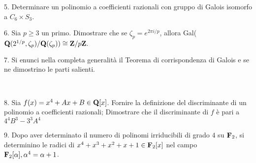 \item{5.} Determinare un polinomio a coefficienti razionali con gruppo di Galois isomorfo a  $C_6\times S_{3}$.
\ve\ \vs

\item{6.} Sia $p\geq3$ un primo. Dimostrare che se $\zeta_p=e^{2\pi i/p}$, allora Gal(${\bf Q}(2^{1/p},\zeta_p)/{\bf Q}(\zeta_p))\cong {\bf Z}/p{\bf Z}.$

\vv \item{7.} Si enunci nella completa generalit\`a il Teorema di
corrispondenza di Galois e se ne dimostrino le parti salienti.

\ve\ \vs


\item{8.} Sia $f(x)=x^4+Ax+B\in{\bf Q}[x]$.
 Fornire la definizione del discriminante di un polinomio a coefficienti razionali;
 Dimostrare che il discriminante di $f$ \`e pari a $4^4B^{3}-3^3A^{4}$
\vv

\item{9.} Dopo aver determinato il numero di polinomi irriducibili di grado $4$ su ${\bf F}_2$, si determinino le radici di 
$x^4+x^3+x^2+x+1\in{\bf F}_2[x]$ nel campo ${\bf F}_2[\alpha], \alpha^4=\alpha+1$.

\ \vst
 \bye
